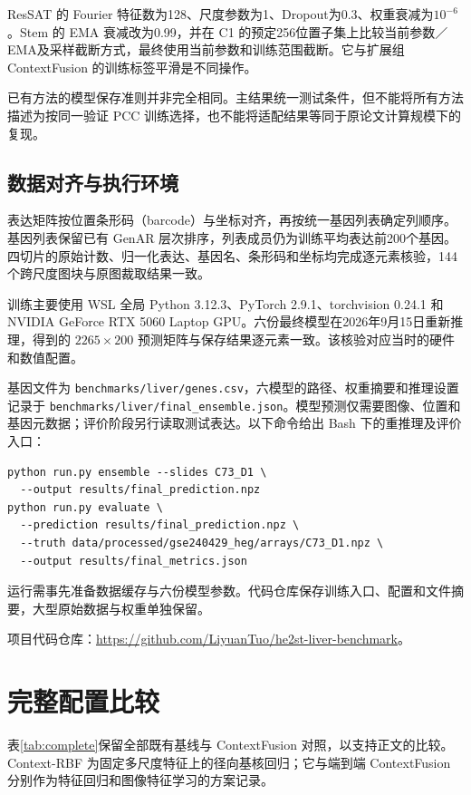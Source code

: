 \documentclass[UTF8,a4paper,11pt,fontset=fandol]{ctexart}
\newcommand{\code}[1]{\nolinkurl{#1}}
\begin{document}
ResSAT 的 Fourier 特征数为128、尺度参数为1、Dropout为0.3、权重衰减为$10^{-6}$。Stem 的 EMA 衰减改为0.99，并在 C1 的预定256位置子集上比较当前参数／EMA及采样截断方式，最终使用当前参数和训练范围截断。它与扩展组 ContextFusion 的训练标签平滑是不同操作。

已有方法的模型保存准则并非完全相同。主结果统一测试条件，但不能将所有方法描述为按同一验证 PCC 训练选择，也不能将适配结果等同于原论文计算规模下的复现。

\subsection{数据对齐与执行环境}
表达矩阵按位置条形码（barcode）与坐标对齐，再按统一基因列表确定列顺序。基因列表保留已有 GenAR 层次排序，列表成员仍为训练平均表达前200个基因。四切片的原始计数、归一化表达、基因名、条形码和坐标均完成逐元素核验，144 个跨尺度图块与原图裁取结果一致。

训练主要使用 WSL 全局 Python 3.12.3、PyTorch 2.9.1、torchvision 0.24.1 和 NVIDIA GeForce RTX 5060 Laptop GPU。六份最终模型在2026年9月15日重新推理，得到的 $2265\times200$ 预测矩阵与保存结果逐元素一致。该核验对应当时的硬件和数值配置。

基因文件为 \code{benchmarks/liver/genes.csv}，六模型的路径、权重摘要和推理设置记录于 \code{benchmarks/liver/final_ensemble.json}。模型预测仅需要图像、位置和基因元数据；评价阶段另行读取测试表达。以下命令给出 Bash 下的重推理及评价入口：
\par\noindent\begin{minipage}{\textwidth}\begin{small}\begin{verbatim}
python run.py ensemble --slides C73_D1 \
  --output results/final_prediction.npz
python run.py evaluate \
  --prediction results/final_prediction.npz \
  --truth data/processed/gse240429_heg/arrays/C73_D1.npz \
  --output results/final_metrics.json
\end{verbatim}\end{small}\end{minipage}\par
运行需事先准备数据缓存与六份模型参数。代码仓库保存训练入口、配置和文件摘要，大型原始数据与权重单独保留。

项目代码仓库：\url{https://github.com/LiyuanTuo/he2st-liver-benchmark}。

\section{完整配置比较}\label{app:configurations}
表\ref{tab:complete}保留全部既有基线与 ContextFusion 对照，以支持正文的比较。Context-RBF 为固定多尺度特征上的径向基核回归；它与端到端 ContextFusion 分别作为特征回归和图像特征学习的方案记录。
\end{document}
